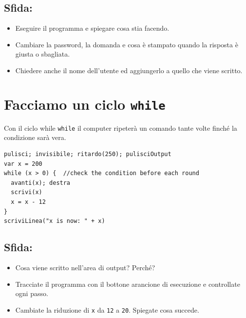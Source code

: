 \section*{\color{BrickRed}Sfida:}


\begin{itemize}

\item {Eseguire il programma e spiegare cosa stia facendo.}
\item {Cambiare la password, la domanda e cosa è stampato quando la risposta è giusta o sbagliata.}
\item {Chiedere anche il nome dell'utente ed aggiungerlo a quello che viene scritto.}

\end{itemize}


\chapter{Facciamo un ciclo \lstinline{while}}Con il ciclo while \lstinline{while} il computer ripeterà un comando tante volte finché la condizione sarà vera.

\begin{lstlisting}[basicstyle={\ttfamily\fontsize{22}{27}\selectfont},numbers=none]
pulisci; invisibile; ritardo(250); pulisciOutput
var x = 200
while (x > 0) {  //check the condition before each round 
  avanti(x); destra
  scrivi(x) 
  x = x - 12
}
scriviLinea("x is now: " + x)
\end{lstlisting}
        
\section*{\color{BrickRed}Sfida:}


\begin{itemize}

\item {Cosa viene scritto nell'area di output? Perché?}
\item {Tracciate il programma con il bottone arancione di esecuzione e controllate ogni passo.}
\item {Cambiate la riduzione di \lstinline{x} da \lstinline{12} a \lstinline{20}. Spiegate cosa succede.}

\end{itemize}


